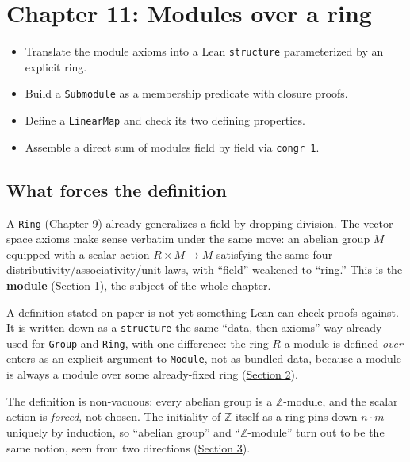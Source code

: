 \chapter{Chapter 11: Modules over a ring}\label{sec:11-modules:00-index:1}

\begin{learningobjectives}
\begin{itemize}
\tightlist
\item
  Translate the module axioms into a Lean \texttt{structure} parameterized by an explicit ring.
\item
  Build a \texttt{Submodule} as a membership predicate with closure proofs.
\item
  Define a \texttt{LinearMap} and check its two defining properties.
\item
  Assemble a direct sum of modules field by field via \texttt{congr 1}.
\end{itemize}
\end{learningobjectives}


\section*{What forces the definition}\label{sec:11-modules:00-index:2}

A \texttt{Ring} (Chapter 9) already generalizes a field by dropping division. The vector-space axioms make sense verbatim under the same move: an abelian group \(M\) equipped with a scalar action \(R \times M \to M\) satisfying the same four distributivity/associativity/unit laws, with ``field'' weakened to ``ring.'' This is the \textbf{module} (\hyperref[sec:11-modules:01-definition:1]{Section 1}), the subject of the whole chapter.

A definition stated on paper is not yet something Lean can check proofs against. It is written down as a \texttt{structure} the same ``data, then axioms'' way already used for \texttt{Group} and \texttt{Ring}, with one difference: the ring \(R\) a module is defined \emph{over} enters as an explicit argument to \texttt{Module}, not as bundled data, because a module is always a module over some already-fixed ring (\hyperref[sec:11-modules:02-translating-into-lean:1]{Section 2}).

The definition is non-vacuous: every abelian group is a \(\mathbb{Z}\)-module, and the scalar action is \emph{forced}, not chosen. The initiality of \(\mathbb{Z}\) itself as a ring pins down \(n \cdot m\) uniquely by induction, so ``abelian group'' and ``\(\mathbb{Z}\)-module'' turn out to be the same notion, seen from two directions (\hyperref[sec:11-modules:03-z-module-example:1]{Section 3}).

